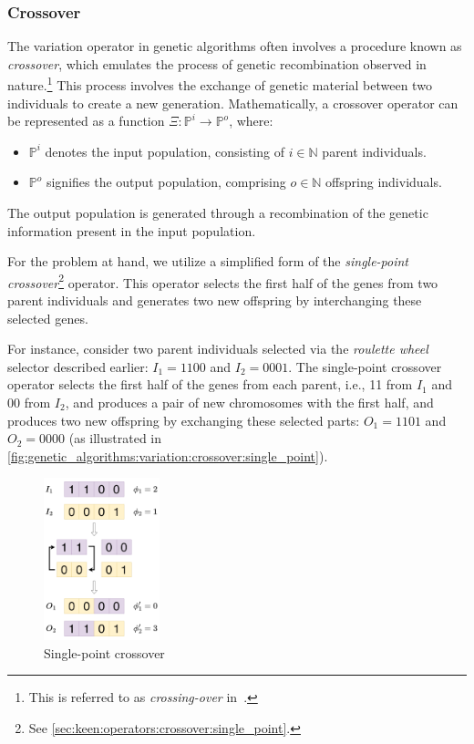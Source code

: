 \subsubsection{Crossover}
\label{sec:genetic_algorithms:variation:crossover}
  The variation operator in genetic algorithms often involves a procedure known as \emph{crossover},
  which emulates the process of genetic recombination observed in nature.\footnote{
    This is referred to as \emph{crossing-over} 
    in~\autocite{hollandAdaptationNaturalArtificial1992a}.
  }
  This process involves the exchange of genetic material between two individuals to create a new 
  generation. 
  Mathematically, a crossover operator can be represented as a function 
  \(\Xi: \mathbb{P}^i \to \mathbb{P}^o\), where:

  \begin{itemize}
    \item \(\mathbb{P}^i\) denotes the input population, consisting of \(i \in \mathbb{N}\) parent 
      individuals.
    \item \(\mathbb{P}^o\) signifies the output population, comprising \(o \in \mathbb{N}\) 
      offspring individuals.
  \end{itemize}

  The output population is generated through a recombination of the genetic information present in 
  the input population.

  For the problem at hand, we utilize a simplified form of the \emph{single-point 
  crossover}\footnote{See \vref{sec:keen:operators:crossover:single_point}.} operator. 
  This operator selects the first half of the genes from two parent individuals and generates two 
  new offspring by interchanging these selected genes.
  
  For instance, consider two parent individuals selected via the \emph{roulette wheel} selector 
  described earlier: \(I_1 = 1100\) and \(I_2 = 0001\).
  The single-point crossover operator selects the first half of the genes from each parent, i.e., 11
  from \(I_1\) and 00 from \(I_2\), and produces a pair of new chromosomes with the first half, and 
  produces two new offspring by exchanging these selected parts: \(O_1 = 1101\) and \(O_2 = 0000\) 
  (as illustrated in \vref{fig:genetic_algorithms:variation:crossover:single_point}).

  \begin{figure}[ht!]
    \centering
    \includegraphics[width=0.3\textwidth]{img/theoretical_framework/Single-Point Crossover.png}
    \caption{Single-point crossover}
    \label{fig:genetic_algorithms:variation:crossover:single_point}
  \end{figure}

